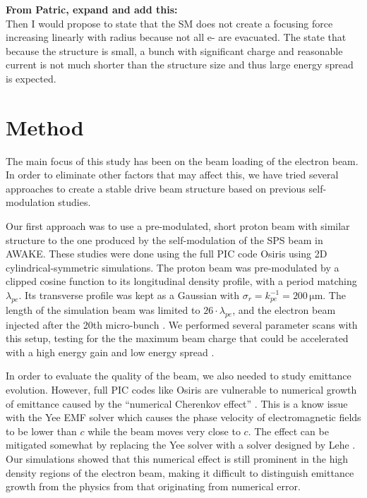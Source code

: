 \documentclass[aps,prstab,reprint,amsmath,amssymb,groupedaddress]{revtex4-1}
\newcommand{\unit}[1]{\,\mathrm{#1}}
\begin{document}
\vspace{1em}
\noindent\textbf{From Patric, expand and add this:}\\
Then I would propose to state that the SM does not create a focusing force increasing linearly with radius because not
all e- are evacuated. The state that because the structure is small, a  bunch with significant charge and reasonable
current is not much shorter than the structure size and thus large energy spread is expected.

\section[\label{S:M}]{Method}

The main focus of this study has been on the beam loading of the electron beam. In order to eliminate other factors that
may affect this, we have tried several approaches to create a stable drive beam structure based on previous self-
modulation studies.

Our first approach was to use a pre-modulated, short proton beam with similar structure to the one produced by the
self-modulation of the SPS beam in AWAKE. These studies were done using the full PIC code Osiris \cite{fonseca:2002}
using 2D cylindrical-symmetric simulations. The proton beam was pre-modulated by a clipped cosine function to its
longitudinal density profile, with a period matching $\lambda_{pe}$. Its transverse profile was kept as a Gaussian with
$\sigma_{r} = k_{pe}^{-1} = 200\unit{\mu m}$. The length of the simulation beam was limited to $26\cdot\lambda_{pe}$,
and the electron beam injected after the 20th micro-bunch \cite{berglyd_olsen:2015}. We performed several parameter
scans with this setup, testing for the the maximum beam charge that could be accelerated with a high energy gain and low
energy spread \cite{adli:2016, berglyd_olsen:2016}.

In order to evaluate the quality of the beam, we also needed to study emittance evolution. However, full PIC codes like
Osiris are vulnerable to numerical growth of emittance caused by the ``numerical Cherenkov effect'' \cite{godfrey:1974}.
This is a know issue with the Yee EMF solver which causes the phase velocity of electromagnetic fields to be lower than
$c$ while the beam moves very close to $c$. The effect can be mitigated somewhat by replacing the Yee solver with a
solver designed by Lehe \cite{lehe:2013}. Our simulations showed that this numerical effect is still prominent in the
high density regions of the electron beam, making it difficult to distinguish emittance growth from the physics from
that originating from numerical error.
\end{document}
